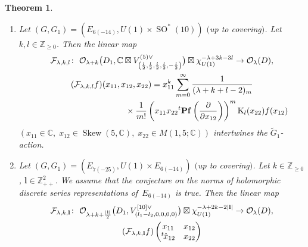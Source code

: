 \documentclass[pdftex]{sigma}
\numberwithin{equation}{section}
\newtheorem{Theorem}{Theorem}[section]
\newcommand{\bl}{\mathbf{l}}
\newcommand{\bn}{\mathbf{n}}
\newcommand{\BZ}{\mathbb{Z}}
\newcommand{\BC}{\mathbb{C}}
\newcommand{\cF}{\mathcal{F}}
\newcommand{\cK}{\mathcal{K}}
\newcommand{\cO}{\mathcal{O}}
\newcommand{\rK}{\mathrm{K}}
\newcommand{\Skew}{\operatorname{Skew}}
\begin{document}
\begin{Theorem}
\begin{enumerate}
\begin{gather*}
{{l_j\le n_j\le l_{j-\lfloor s'/2\rfloor}\; (\lfloor s'/2\rfloor+1\le j\le \lfloor s''/2\rfloor)}}\hspace{-30pt}
\frac{1}{(\lambda+k+\bl-1)_{\bn-\bl,4}}\\
\hphantom{(\cF_{\lambda,k,\bl}f)\begin{pmatrix}x_{11}&x_{12}\\-{}^t\hspace{-1pt}x_{12}&x_{22}\end{pmatrix}=}{} \times \cK_{\bn,\bl}^{(4)}\left(x_{22};
\overline{{\vphantom{\biggl(}}^t\!\!\left(\frac{\partial}{\partial x_{12}}\right)x_{11}\frac{\partial}{\partial x_{12}}}\right)
f(y_{12})
\end{gather*}
intertwines the $\tilde{G}_1$-action.
\item[$(3)$] Let $(G,G_1)=(E_{6(-14)}, U(1)\times \operatorname{SO}^*(10))$ $($up to covering$)$. Let $k,l\in\BZ_{\ge 0}$.
Then the linear map
\begin{gather*}
\cF_{\lambda,k,l}\colon \ \cO_{\lambda+k}\big(D_1,\BC\boxtimes V_{\left(\frac{l}{2},\frac{l}{2},\frac{l}{2},\frac{l}{2},-\frac{l}{2}\right)}^{(5)\vee}\big)
\boxtimes\chi_{U(1)}^{-\lambda+3k-3l}\to \cO_\lambda(D), \\
(\cF_{\lambda,k,l}f)(x_{11},x_{12},x_{22})=x_{11}^k\sum_{m=0}^\infty\frac{1}{(\lambda+k+l-2)_m}\\
\hphantom{(\cF_{\lambda,k,l}f)(x_{11},x_{12},x_{22})=}{} \times \frac{1}{m!}\left(x_{11}x_{22}{}^t\mathbf{Pf}\left(\frac{\partial}{\partial x_{12}}\right)\right)^m\rK_l(x_{22})f(x_{12})
\end{gather*}
$(x_{11}\in\BC,\; x_{12}\in\Skew(5,\BC),\; x_{22}\in M(1,5;\BC))$ intertwines the $\tilde{G}_1$-action.
\item[$(4)$] Let $(G,G_1)=(E_{7(-25)}, U(1)\times E_{6(-14)})$ $($up to covering$)$. Let $k\in\BZ_{\ge 0}$, $\bl\in\BZ_{++}^2$.
We assume that the conjecture on the norms of holomorphic discrete series representations of~$E_{6(-14)}$ {\rm \cite[Conjecture 5.11]{N2}} is true.
Then the linear map
\begin{gather*}
\cF_{\lambda,k,\bl}\colon \ \cO_{\lambda+k+\frac{|\bl|}{2}}\big(D_1,V_{(l_1-l_2,0,0,0,0)}^{[10]\vee}\big)
\boxtimes\chi_{U(1)}^{-\lambda+2k-2|\bl|}\to \cO_\lambda(D), \\
(\cF_{\lambda,k,\bl}f)\begin{pmatrix}x_{11}&x_{12}\\{}^t\hspace{-1pt}\hat{x}_{12}&x_{22}\end{pmatrix} \\

\end{gather*}
\end{enumerate}
\end{Theorem}
\end{document}
